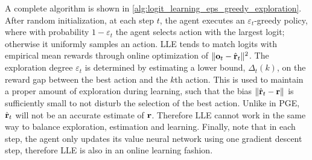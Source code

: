 A complete algorithm is shown in \cref{alg:logit_learning_eps_greedy_exploration}. After random initialization, at each step $t$, the agent executes an $\varepsilon_t$-greedy policy, where with probability $1 - \varepsilon_t$ the agent selects action with the largest logit; otherwise it uniformly samples an action. LLE tends to match logits with empirical mean rewards through online optimization of $\| {\mathbf{o}}_t - \hat{{\mathbf{r}}}_t\|^2$.
The exploration degree $\varepsilon_t$ is determined by estimating a lower bound, $\hat{\Delta}_t(k)$, on the reward gap between the best action and the $k$th action. This is used to maintain a proper amount of exploration during learning, such that the bias $\| \hat{{\mathbf{r}}}_t - {\mathbf{r}} \|$ is sufficiently small to not disturb the selection of the best action. Unlike in PGE, $\hat{{\mathbf{r}}}_t$ will not be an accurate estimate of ${\mathbf{r}}$. Therefore LLE cannot work in the same way to balance exploration, estimation and learning. Finally, note that in each step, the agent only updates its value neural network using one gradient descent step, therefore LLE is also in an online learning fashion.

